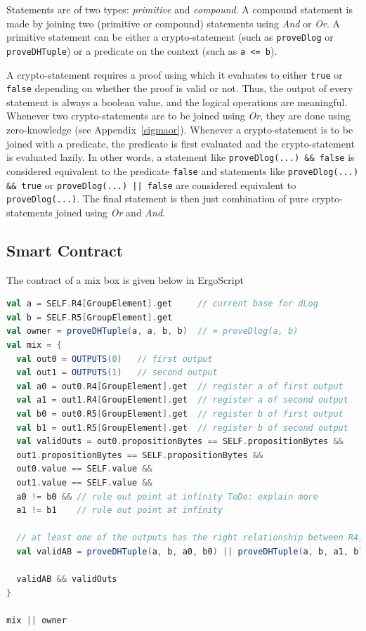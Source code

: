 \documentclass[runningheads]{llncs}
\begin{document}
Statements are of two types: {\em primitive} and {\em compound}. A compound statement is made by joining two (primitive or compound) statements using {\em And} or {\em Or}. A primitive statement can be either a {\en crypto-statement} (such as \texttt{proveDlog} or \texttt{proveDHTuple}) or a predicate on the context (such as \texttt{a <= b}).

A crypto-statement requires a proof using which it evaluates to either \texttt{true} or \texttt{false} depending on whether the proof is valid or not.
Thus, the output of every statement is always a boolean value, and the logical operations are meaningful.
Whenever two crypto-statements are to be joined using {\em Or}, they are done using zero-knowledge (see  Appendix~\ref{sigmaor}).
Whenever a crypto-statement is to be joined with a predicate, the predicate is first evaluated and the crypto-statement is evaluated lazily. In other words, a statement like \texttt{proveDlog(...) \&\& false} is considered equivalent to the predicate \texttt{false} and statements like \texttt{proveDlog(...) \&\& true} or \texttt{proveDlog(...) || false} are considered equivalent to \texttt{proveDlog(...)}. The final statement is then just combination of pure crypto-statements joined using {\em Or} and {\em And}.

\subsection{Smart Contract}
\label{smart-contract}

The contract of a mix box is given below in ErgoScript
\begin{lstlisting}[language=Scala,caption={Mix-script},label=mixScript]
val a = SELF.R4[GroupElement].get     // current base for dLog
val b = SELF.R5[GroupElement].get
val owner = proveDHTuple(a, a, b, b)  // = proveDlog(a, b)
val mix = {
  val out0 = OUTPUTS(0)   // first output
  val out1 = OUTPUTS(1)   // second output
  val a0 = out0.R4[GroupElement].get  // register a of first output
  val a1 = out1.R4[GroupElement].get  // register a of second output
  val b0 = out0.R5[GroupElement].get  // register b of first output
  val b1 = out1.R5[GroupElement].get  // register b of second output
  val validOuts = out0.propositionBytes == SELF.propositionBytes &&
  out1.propositionBytes == SELF.propositionBytes &&
  out0.value == SELF.value &&
  out1.value == SELF.value &&
  a0 != b0 && // rule out point at infinity ToDo: explain more
  a1 != b1    // rule out point at infinity

  // at least one of the outputs has the right relationship between R4, R5
  val validAB = proveDHTuple(a, b, a0, b0) || proveDHTuple(a, b, a1, b1)

  validAB && validOuts
}

mix || owner
\end{lstlisting}
\end{document}
